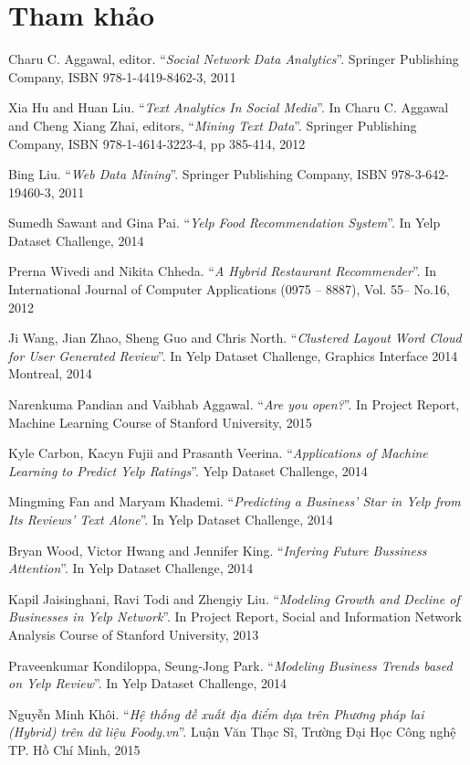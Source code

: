 \documentclass[12pt]{extarticle}
\begin{document}
	\section {Tham khảo}
\begin{enumerate}[label={[\arabic*]}]
	\item Charu C. Aggawal, editor. “\textit{Social Network Data Analytics}”. Springer Publishing Company, ISBN 978-1-4419-8462-3, 2011
	\item Xia Hu and Huan Liu. “\textit{Text Analytics In Social Media}”. In Charu C. Aggawal and Cheng Xiang Zhai, editors, “\textit{Mining Text Data}”. Springer Publishing Company, ISBN 978-1-4614-3223-4, pp 385-414, 2012
	\item Bing Liu. “\textit{Web Data Mining}”. Springer Publishing Company, ISBN 978-3-642-19460-3, 2011
	\item Sumedh Sawant and Gina Pai. “\textit{Yelp Food Recommendation System}”. In Yelp Dataset Challenge, 2014
	\item Prerna Wivedi and Nikita Chheda. “\textit{A Hybrid Restaurant Recommender}”. In International Journal of Computer Applications (0975 – 8887), Vol. 55– No.16, 2012
	\item Ji Wang, Jian Zhao, Sheng Guo and Chris North. “\textit{Clustered Layout Word Cloud for User Generated Review}”. In Yelp Dataset Challenge, Graphics Interface 2014 Montreal, 2014
	\item Narenkuma Pandian and Vaibhab Aggawal. “\textit{Are you open?}”. In Project Report, Machine Learning Course of Stanford University, 2015
	\item Kyle Carbon, Kacyn Fujii and Prasanth Veerina. “\textit{Applications of Machine Learning to Predict Yelp Ratings}”. Yelp Dataset Challenge, 2014
	\item Mingming Fan and Maryam Khademi. “\textit{Predicting a Business’ Star in Yelp from Its Reviews’ Text Alone}”. In Yelp Dataset Challenge, 2014
	\item Bryan Wood, Victor Hwang and Jennifer King. “\textit{Infering Future Bussiness Attention}”. In Yelp Dataset Challenge, 2014
	\item Kapil Jaisinghani, Ravi Todi and Zhengiy Liu. “\textit{Modeling Growth and Decline of Businesses in Yelp Network}”. In Project Report, Social and Information Network Analysis Course of Stanford University, 2013
	\item Praveenkumar Kondiloppa, Seung-Jong Park. “\textit{Modeling Business Trends based on Yelp Review}”. In Yelp Dataset Challenge, 2014 
	\item Nguyễn Minh Khôi. “\textit{Hệ thống đề xuất địa điểm dựa trên Phương pháp lai (Hybrid) trên dữ liệu Foody.vn}”. Luận Văn Thạc Sĩ, Trường Đại Học Công nghệ TP. Hồ Chí Minh, 2015

\end{enumerate}
\end{document}
